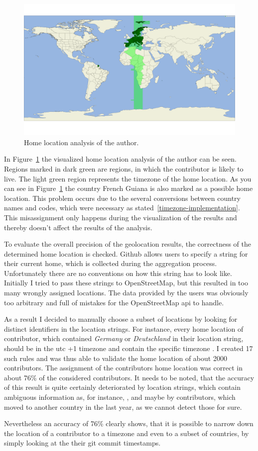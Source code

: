 \begin{figure}[H]
    \includegraphics[scale=0.10]{./graphs/analysis/author-home-location}
    \centering
    \caption{Home location analysis of the author.}\label{fig:author-home-location}
\end{figure}

In Figure~\ref{fig:author-home-location} the visualized home location analysis of the author can be seen.
Regions marked in dark green are regions, in which the contributor is likely to live.
The light green region represents the timezone of the home location.
As you can see in Figure~\ref{fig:author-home-location} the country French Guiana is also marked as a possible home location.
This problem occurs due to the several conversions between country names and codes, which were necessary as stated~\ref{timezone-implementation}.
This misassignment only happens during the visualization of the results and thereby doesn't affect the results of the analysis.

To evaluate the overall precision of the geolocation results, the correctness of the determined home location is checked.
Github allows users to specify a string for their current home, which is collected during the aggregation process.
Unfortunately there are no conventions on how this string has to look like.
Initially I tried to pass these strings to OpenStreetMap, but this resulted in too many wrongly assigned locations.
The data provided by the users was obviously too arbitrary and full of mistakes for the OpenStreetMap \ac{api} to handle.

As a result I decided to manually choose a subset of locations by looking for distinct identifiers in the location strings.
For instance, every home location of contributor, which contained \emph{Germany} or \emph{Deutschland} in their location string, should be in the \ac{utc} +1 timezone and contain the specific timezone .
I created 17 such rules and was thus able to validate the home location of about 2000 contributors.
The assignment of the contributors home location was correct in about 76\% of the considered contributors.
It needs to be noted, that the accuracy of this result is quite certainly deteriorated by location strings, which contain ambiguous information as, for instance, , and maybe by contributors, which moved to another country in the last year, as we cannot detect those for sure.

Nevertheless an accuracy of 76\% clearly shows, that it is possible to narrow down the location of a contributor to a timezone and even to a subset of countries, by simply looking at the their git commit timestamps.
